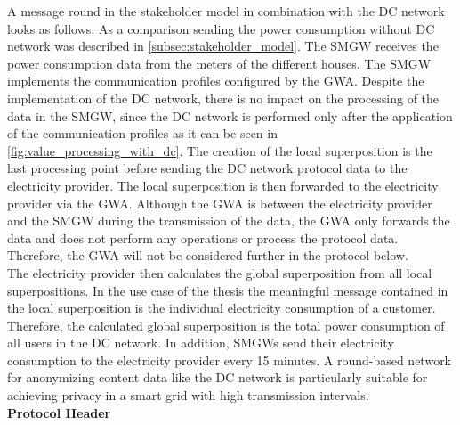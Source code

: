 A message round in the stakeholder model in combination with the DC network looks as follows. As a comparison sending the power consumption without DC network was described in \ref{subsec:stakeholder_model}. The \gls{SMGW} receives the power consumption data from the meters of the different houses. The \gls{SMGW} implements the communication profiles configured by the \gls{GWA}. Despite the implementation of the DC network, there is no impact on the processing of the data in the \gls{SMGW}, since the DC network is performed only after the application of the communication profiles as it can be seen in \ref{fig:value_processing_with_dc}. The creation of the local superposition is the last processing point before sending the DC network protocol data to the electricity provider. The local superposition is then forwarded to the electricity provider via the \gls{GWA}. Although the \gls{GWA} is between the electricity provider and the \gls{SMGW} during the transmission of the data, the \gls{GWA} only forwards the data and does not perform any operations or process the protocol data. Therefore, the \gls{GWA} will not be considered further in the protocol below.\\ The electricity provider then calculates the global superposition from all local superpositions. In the use case of the thesis the meaningful message contained in the local superposition is the individual electricity consumption of a customer. Therefore, the calculated global superposition is the total power consumption of all users in the DC network. In addition, \gls{SMGW}s send their electricity consumption to the electricity provider every 15 minutes. A round-based network for anonymizing content data like the DC network is particularly suitable for achieving privacy in a smart grid with high transmission intervals.
\\
\textbf{Protocol Header}

